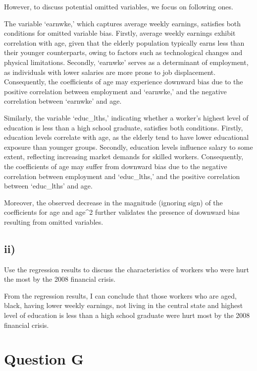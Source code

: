 \documentclass[
]{article}
\begin{document}
However, to discuss potential omitted variables, we focus on following
ones.

The variable `earnwke,' which captures average weekly earnings,
satisfies both conditions for omitted variable bias. Firstly, average
weekly earnings exhibit correlation with age, given that the elderly
population typically earns less than their younger counterparts, owing
to factors such as technological changes and physical limitations.
Secondly, `earnwke' serves as a determinant of employment, as
individuals with lower salaries are more prone to job displacement.
Consequently, the coefficients of age may experience downward bias due
to the positive correlation between employment and `earnwke,' and the
negative correlation between `earnwke' and age.

Similarly, the variable `educ\_lths,' indicating whether a worker's
highest level of education is less than a high school graduate,
satisfies both conditions. Firstly, education levels correlate with age,
as the elderly tend to have lower educational exposure than younger
groups. Secondly, education levels influence salary to some extent,
reflecting increasing market demands for skilled workers. Consequently,
the coefficients of age may suffer from downward bias due to the
negative correlation between employment and `educ\_lths,' and the
positive correlation between `educ\_lths' and age.

Moreover, the observed decrease in the magnitude (ignoring sign) of the
coefficients for age and age\^{}2 further validates the presence of
downward bias resulting from omitted variables.

\hypertarget{ii-3}{%
\subsection{ii)}\label{ii-3}}

Use the regression results to discuss the characteristics of workers who
were hurt the most by the 2008 financial crisis. \vspace{1em}

From the regression results, I can conclude that those workers who are
aged, black, having lower weekly earnings, not living in the central
state and highest level of education is less than a high school graduate
were hurt most by the 2008 financial crisis.

\hypertarget{question-g}{%
\section{Question G}\label{question-g}}
\end{document}
